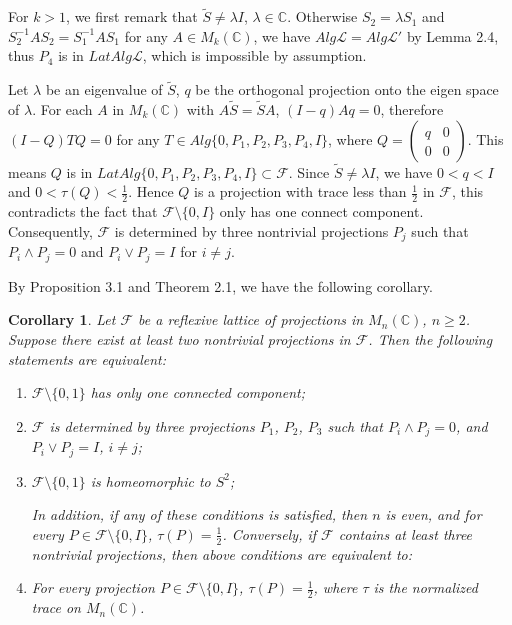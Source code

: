 \documentclass[12pt]{article}
\newtheorem{corollary}{Corollary}[section]
\newcommand{\FFF}{\mathcal F}
\newcommand{\C}{\mathbb C} %
\def\L{{\mathcal{L}}}
\begin{document}
{For $k > 1$, we first remark that $\widetilde{S} \neq \lambda I$, $\lambda \in \C$. Otherwise
$S_2 = \lambda S_1$ and $S_2^{-1}AS_2=S_1^{-1}AS_1$ for any $A\in M_k(\C)$,  we have $ Alg\L= Alg\L'$ by Lemma 2.4, thus $P_4$ is in $LatAlg\L$, which is impossible by assumption.

Let $\lambda$ be an eigenvalue of $\widetilde{S}$, $q$ be the
orthogonal projection onto the eigen space of $\lambda$. For each $A$ in
$M_k(\C)$ with $A\widetilde{S}=\widetilde{S}A$, $(I-q)Aq = 0$, therefore $(I-Q)TQ = 0$ for any $T \in Alg\{0,P_1,P_2,P_3,P_4,I\}$, where $Q=\left(\begin{array}{cc}
q&0\\0&0\end{array}\right)$. This means $Q$ is in $LatAlg\{0,P_1,P_2,P_3,P_4,I\}\subset \FFF$. Since $\widetilde{S} \neq \lambda I$, we have $0 < q < I$ and $0<\tau(Q)<\frac 12$. Hence $Q$ is a projection with trace less than $\frac12$ in $\FFF$, this contradicts the fact that $\FFF \setminus \{0, I\}$ only has one connect component. Consequently, $\FFF$ is determined by three nontrivial projections
$P_j$ such that $P_i\wedge P_j=0$ and $P_i\vee P_j=I$ for $i\neq j$.

\vspace{2mm}

By Proposition 3.1 and Theorem 2.1, we have the following corollary.

\begin{corollary}
 Let $\FFF$ be a reflexive lattice of projections in $M_n(\C)$, $n \geq 2$. Suppose there exist at least two
nontrivial projections in $\FFF$. Then the following statements are
equivalent:
\begin{enumerate}
\item[(i)] $\FFF \setminus \{0, 1 \}$ has only one connected component;
\item[(ii)] $\FFF$ is determined by three projections $P_1$,
$P_2$, $P_3$ such that $P_i \wedge P_j = 0$, and $P_i \vee P_j = I$,
$i \neq j$;
\item[(iii)] $\FFF \setminus \{0, 1 \}$ is  homeomorphic to
$S^2$;

\noindent In addition, if any of these conditions is satisfied, then $n$ is
even, and  for every $P\in\FFF\setminus\{0,I\}$, $\tau(P)=\frac12$.
Conversely, if $\FFF$ contains at least three nontrivial
projections, then above conditions are equivalent to:

\item[(iv)] For every projection $P\in\FFF\setminus \{0,I\}$, $\tau(P)=\frac 12$, where 
$\tau$ is the normalized trace on $M_n(\C)$.
\end{enumerate}
\end{corollary}

}
\end{document}
